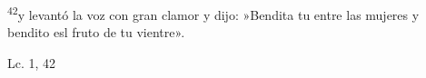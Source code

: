 \documentclass[../../rosario.tex]{subfiles}
\begin{document}
    \textsuperscript{42}y levantó la voz con gran clamor y dijo: »Bendita tu entre las mujeres y bendito esl fruto de tu vientre».
    \begin{flushright}
    Lc. 1, 42         
    \end{flushright}
\end{document}
